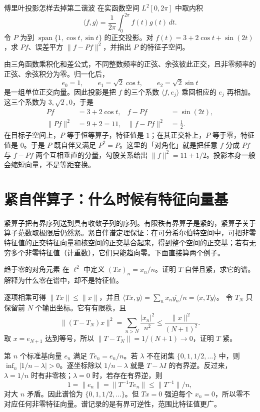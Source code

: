 \begin{example}{傅里叶投影怎样去掉第二谐波}
在实函数空间 \(L^2[0,2\pi]\) 中取内积
\[
\langle f,g\rangle=\frac{1}{2\pi}\int_0^{2\pi}f(t)g(t)\,dt.
\]
令 \(P\) 为到 \(\operatorname{span}\{1,\cos t,\sin t\}\) 的正交投影。对 \(f(t)=3+2\cos t+\sin(2t)\)，求 \(Pf\)、误差平方 \(\|f-Pf\|^2\)，并指出 \(P\) 的特征子空间。
\end{example}
\begin{solution}
由三角函数乘积化和差公式，不同整数频率的正弦、余弦彼此正交，且非零频率的正弦、余弦积分为零。归一化后，
\[
 e_0=1,\qquad e_1=\sqrt2\cos t,\qquad e_2=\sqrt2\sin t
\]
是一组单位正交向量。因此投影是把 \(f\) 的三个系数 \(\langle f,e_j\rangle\) 乘回相应的 \(e_j\) 再相加。这三个系数为 \(3,\sqrt2,0\)，于是
\begin{align*}
 Pf&=3+2\cos t, & f-Pf&=\sin(2t),\\
 \|Pf\|^2&=9+2=11, & \|f-Pf\|^2&=\frac12.
\end{align*}
在目标子空间上，\(P\) 等于恒等算子，特征值是 \(1\)；在其正交补上，\(P\) 等于零，特征值是 \(0\)。于是 \(P\) 既自伴又满足 \(P^2=P\)。这里的「对角化」就是把任意 \(f\) 分成 \(Pf\) 与 \(f-Pf\) 两个互相垂直的分量，勾股关系给出 \(\|f\|^2=11+1/2\)。投影本身一般会缩短向量，不是等距变换。
\end{solution}

\section{紧自伴算子：什么时候有特征向量基}

紧算子把有界序列送到具有收敛子列的序列。有限秩有界算子是紧的，紧算子关于算子范数取极限后仍然紧。紧自伴谱定理保证：在可分希尔伯特空间中，可把非零特征值的正交特征向量和核空间的正交基合起来，得到整个空间的正交基；若有无穷多个非零特征值（计重数），它们只能趋向零。下面直接算两个例子。

\begin{example}{趋于零的对角元素}
在 \(\ell^2\) 中定义 \((Tx)_n=x_n/n\)。证明 \(T\) 自伴且紧，求它的谱。解释为什么零在谱中，却不是特征值。
\end{example}
\begin{solution}
逐项相乘可得 \(\|Tx\|\leq\|x\|\)，并且
\(\langle Tx,y\rangle=\sum_n x_n\overline{y_n}/n=\langle x,Ty\rangle\)。
令 \(T_N\) 只保留前 \(N\) 个输出坐标。它有有限秩，且
\[
 \|(T-T_N)x\|^2
 =\sum_{n>N}\frac{|x_n|^2}{n^2}
 \leq \frac{\|x\|^2}{(N+1)^2}.
\]
取 \(x=e_{N+1}\) 达到等号，所以 \(\|T-T_N\|=1/(N+1)\to0\)，证明 \(T\) 紧。

第 \(n\) 个标准基向量 \(e_n\) 满足 \(Te_n=e_n/n\)。若 \(\lambda\) 不在闭集 \(\{0,1,1/2,\ldots\}\) 中，则 \(\inf_n|1/n-\lambda|>0\)。逐坐标除以 \(1/n-\lambda\) 就是 \(T-\lambda I\) 的有界逆。反过来，\(\lambda=1/n\) 时有非零核；\(\lambda=0\) 时，若存在有界逆，则
\[
 1=\|e_n\|=\|T^{-1}Te_n\|\leq \|T^{-1}\|/n,
\]
对大 \(n\) 矛盾。因此谱恰为 \(\{0,1,1/2,\ldots\}\)。但 \(Tx=0\) 强迫每个 \(x_n=0\)，所以零不对应任何非零特征向量。谱记录的是有界可逆性，范围比特征值更广。
\end{solution}

